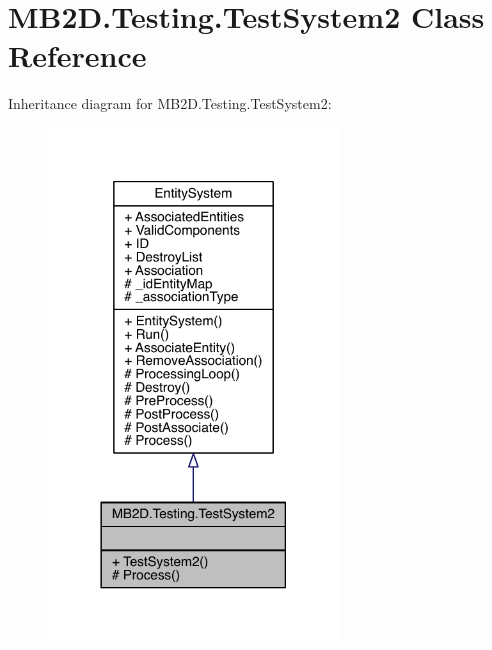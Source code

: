 \hypertarget{class_m_b2_d_1_1_testing_1_1_test_system2}{}\section{M\+B2\+D.\+Testing.\+Test\+System2 Class Reference}
\label{class_m_b2_d_1_1_testing_1_1_test_system2}


Inheritance diagram for M\+B2\+D.\+Testing.\+Test\+System2\+:
\nopagebreak
\begin{figure}[H]
\begin{center}
\leavevmode
\includegraphics[width=218pt]{class_m_b2_d_1_1_testing_1_1_test_system2__inherit__graph}
\end{center}
\end{figure}


